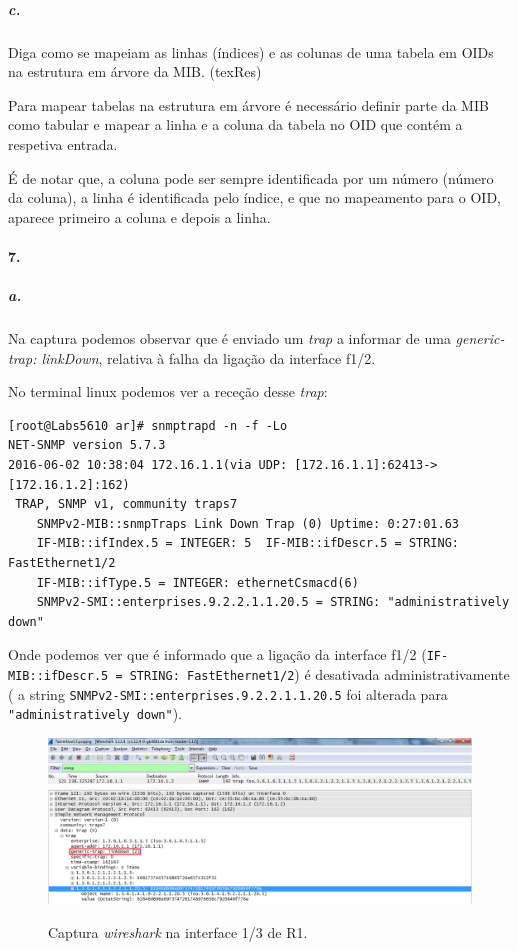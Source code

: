 \subparagraph{c.}
Diga como se mapeiam as linhas (índices) e as colunas de uma tabela em OIDs na estrutura em árvore da MIB. (texRes)

Para mapear tabelas na estrutura em árvore é necessário definir parte da MIB como tabular e mapear a linha e a coluna da tabela no OID que contém a respetiva entrada.

É de notar que, a coluna pode ser sempre identificada por um número (número da coluna), a linha é identificada pelo índice, e que no mapeamento para o OID, aparece primeiro a coluna e depois  a linha.


\paragraph{7.}

\subparagraph{a.}
Na captura podemos observar que é enviado um \emph{trap} a informar de uma \emph{generic-trap: linkDown}, relativa à falha da ligação da interface \textsf{f1/2}.

No terminal \textsf{linux} podemos ver a receção desse \emph{trap}:
\begin{verbatim}
[root@Labs5610 ar]# snmptrapd -n -f -Lo
NET-SNMP version 5.7.3
2016-06-02 10:38:04 172.16.1.1(via UDP: [172.16.1.1]:62413->[172.16.1.2]:162)
 TRAP, SNMP v1, community traps7
	SNMPv2-MIB::snmpTraps Link Down Trap (0) Uptime: 0:27:01.63
	IF-MIB::ifIndex.5 = INTEGER: 5	IF-MIB::ifDescr.5 = STRING: FastEthernet1/2
	IF-MIB::ifType.5 = INTEGER: ethernetCsmacd(6)	
	SNMPv2-SMI::enterprises.9.2.2.1.1.20.5 = STRING: "administratively down"
\end{verbatim}

Onde podemos ver que é informado que a ligação da interface \textsf{f1/2} (\texttt{IF-MIB::ifDescr.5 = STRING: FastEthernet1/2}) é desativada administrativamente ( a string \texttt{SNMPv2-SMI::enterprises.9.2.2.1.1.20.5} foi alterada para \texttt{"administratively down"}).

\begin{figure}[h]
\centering
\includegraphics[width=1\textwidth, height=0.3\textheight]{7a.png}
\label{fig:10-capturaWireshark}
\caption{Captura \emph{wireshark} na interface \textsf{1/3} de \textsf{R1}.}
\end{figure}


